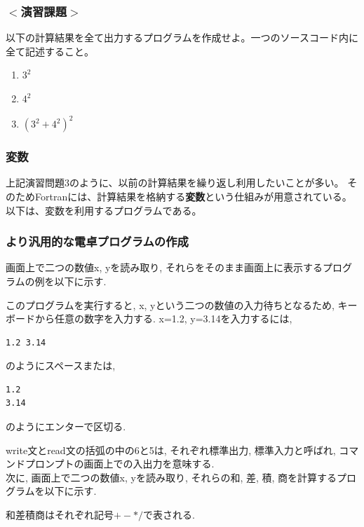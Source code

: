\documentclass[a4j]{jsarticle}
\begin{document}
\subsubsection*{$<$演習課題$>$}
以下の計算結果を全て出力するプログラムを作成せよ。一つのソースコード内に全て記述すること。
\begin{enumerate}
\item $3^2$
\item $4^2$
\item $(3^2+4^2)^2$
\end{enumerate}

\subsubsection*{変数}
上記演習問題3のように、以前の計算結果を繰り返し利用したいことが多い。
そのためFortranには、計算結果を格納する{\bfseries 変数}という仕組みが用意されている。
以下は、変数を利用するプログラムである。



\subsubsection*{より汎用的な電卓プログラムの作成}

画面上で二つの数値x, yを読み取り, それらをそのまま画面上に表示するプログラムの例を以下に示す. 

このプログラムを実行すると, x, yという二つの数値の入力待ちとなるため, 
キーボードから任意の数字を入力する. 
x=1.2, y=3.14を入力するには, 
\begin{Verbatim}[frame=single]
1.2 3.14
\end{Verbatim}
のようにスペースまたは, 
\begin{Verbatim}[frame=single]
1.2
3.14
\end{Verbatim}
のようにエンターで区切る. 

write文とread文の括弧の中の6と5は, 
それぞれ標準出力, 標準入力と呼ばれ, コマンドプロンプトの画面上での入出力を意味する. \\


次に, 画面上で二つの数値x, yを読み取り, それらの和, 差, 積, 商を計算するプログラムを以下に示す.  

和差積商はそれぞれ記号$+-*/$で表される. 
\\
\end{document}
